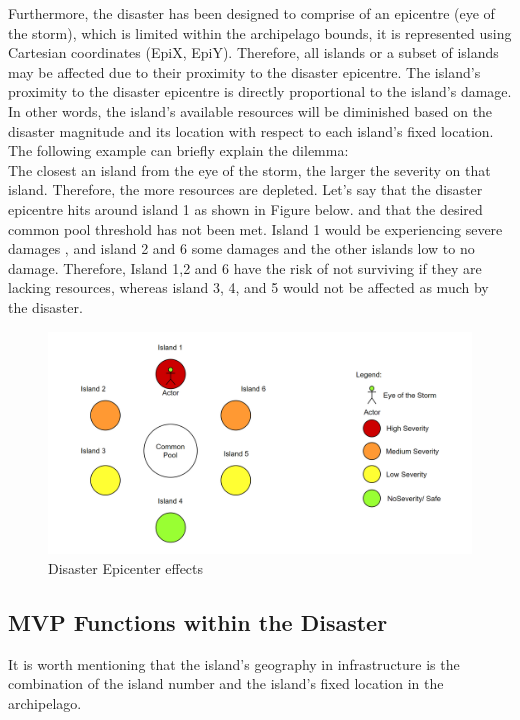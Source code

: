 Furthermore, the disaster has been designed to comprise of an epicentre (eye of the storm), which is limited within the archipelago bounds, it is represented using Cartesian coordinates (EpiX, EpiY). Therefore, all islands or a subset of islands may be affected due to their proximity to the disaster epicentre. The island’s proximity to the disaster epicentre is directly proportional to the island’s damage. In other words, the island's available resources will be diminished based on the disaster magnitude and its location with respect to each island’s fixed location.\\

The following example can briefly explain the dilemma:\\

The closest an island from the eye of the storm, the larger the severity on that island. Therefore, the more resources are depleted. Let’s say that the disaster epicentre hits around island 1 as shown in Figure below. and that the desired common pool threshold has not been met. Island 1 would be experiencing severe damages , and island 2 and 6 some damages and the other islands low to no damage. Therefore, Island 1,2 and 6 have the risk of not surviving if they are lacking resources, whereas island 3, 4, and 5 would not be affected as much by the disaster.

\begin{figure}[!htb]
    \centering
    \includegraphics[width=1\textwidth]{04_environment/Images/Disaster eye of the storm severity.PNG}
    \caption{Disaster Epicenter effects}
    \label{Images:Disaster eye of the storm severity}
\end{figure}

\newpage
\subsection{MVP Functions within the Disaster}
It is worth mentioning that the island's geography in infrastructure is the combination of the island number and the island’s fixed location in the archipelago.\\

